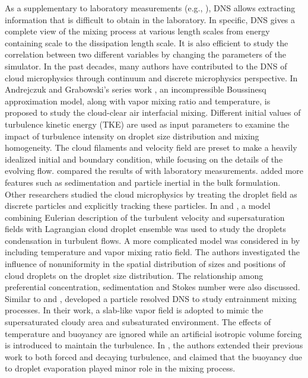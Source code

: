 \documentclass[draft,jgrga]{AGUTeX}
\begin{document}
\begin{article}
As a supplementary to laboratory measurements (e.g., \cite{Malinowski2008}), DNS allows extracting information that is difficult to obtain in the laboratory. In specific, DNS gives a complete view of the mixing process at various length scales from energy containing scale to the dissipation length scale. It is also efficient to study the correlation between two different variables by changing the parameters of the simulator. In the past decades, many authors have contributed to the DNS of cloud microphysics through continuum and discrete microphysics perspective. In Andrejczuk and Grabowski's series work \cite{And04,And06,And09}, an incompressible Boussinesq approximation model, along with vapor mixing ratio and temperature, is proposed to study the cloud-clear air interfacial mixing. Different initial values of turbulence kinetic energy (TKE) are used as input parameters to examine the impact of turbulence intensity on droplet size distribution and mixing homogeneity. The cloud filaments and velocity field are preset to make a heavily idealized initial and boundary condition, while focusing on the details of the evolving flow. \cite{Malinowski2008} compared the results of \cite{And04,And06} with laboratory measurements. \cite{Lozar2014} added more features such as sedimentation and particle inertial in the bulk formulation. Other researchers studied the cloud microphysics by treating the droplet field as discrete particles and explicitly tracking these particles. In \cite{Lanotte2009} and \cite{Celani05}, a model combining Eulerian description of the turbulent velocity and supersaturation fields with Lagrangian cloud droplet ensemble was used to study the droplets condensation in turbulent flows. A more complicated model was considered in \cite{Vaillancourt00,Vaillancourt02} by including temperature and vapor mixing ratio field. The authors investigated the influence of nonuniformity in the spatial distribution of sizes and positions of cloud droplets on the droplet size distribution. The relationship among preferential concentration, sedimentation and Stokes number were also discussed. 
Similar to \cite{Vaillancourt02} and \cite{Lanotte2009}, \cite{Kumar11,Kumar12} developed a particle resolved DNS to study entrainment mixing processes. In their work, a slab-like vapor field is adopted to mimic the supersaturated cloudy area and subsaturated environment. The effects of temperature and buoyancy are ignored while an artificial isotropic volume forcing is introduced to maintain the turbulence. In \cite{Kumar14}, the authors extended their previous work to both forced and decaying turbulence, and claimed that the buoyancy due to droplet evaporation played minor role in the mixing process.


\end{article}
\end{document}
